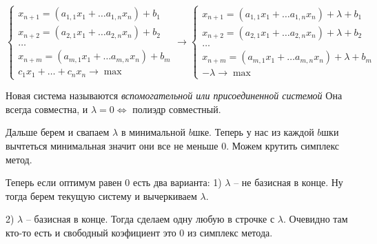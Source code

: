 \[
    \begin{cases}
        x_{n + 1} = (a_{1, 1}x_1 + \dots a_{1, n} x_n) + b_1\\
        x_{n + 2} = (a_{2, 1}x_1 + \dots a_{2, n} x_n) + b_2\\
        \dots\\
        x_{n + m} = (a_{m, 1}x_1 + \dots a_{m, n} x_n) + b_m\\
        c_1 x_1 + \dots + c_n x_n \to \max
    \end{cases}\to
    \begin{cases}
        x_{n + 1} = (a_{1, 1}x_1 + \dots a_{1, n} x_n) + \lambda + b_1\\
        x_{n + 2} = (a_{2, 1}x_1 + \dots a_{2, n} x_n) + \lambda + b_2\\
        \dots\\
        x_{n + m} = (a_{m, 1}x_1 + \dots a_{m, n} x_n) + \lambda + b_m\\
        -\lambda \to \max
    \end{cases}
\]

Новая система называются \emph{вспомогательной или присоединенной системой}
Она всегда совместна, и $\lambda = 0 \Leftrightarrow$ полиэдр совместный.

Дальше берем и свапаем $\lambda$ в минимальной $b$шке. 
Теперь у нас из каждой $b$шки вычтеться минимальная значит они все не меньше 0. Можем крутить симплекс метод.

Теперь если оптимум равен 0 есть два варианта:
1) $\lambda$ -- не базисная в конце. Ну тогда берем текущую систему и вычеркиваем $\lambda$.

2) $\lambda$ -- базисная в конце. Тогда сделаем одну любую в строчке с $\lambda$. 
Очевидно там кто-то есть и свободный коэфициент это 0 из симплекс метода.
